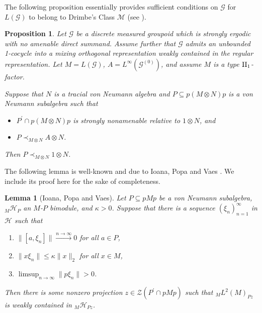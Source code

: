 \documentclass[a4paper,11pt]{article}
\numberwithin{equation}{section}
\newtheorem{lem}[thm]{Lemma}
\newtheorem{prop}[thm]{Proposition}
\theoremstyle{definition}
\theoremstyle{remark}
\numberwithin{equation}{section}
\newcommand{\rG}{\mathcal{G}}
\def\H{\mathcal H}
\def\sub{\subseteq}
\newcommand{\mc}[1]{\mathcal{#1}}
\providecommand{\norm}[1]{\lVert#1\rVert}
\numberwithin{equation}{section}
\begin{document}
The following proposition essentially provides sufficient conditions on $ \rG $ for $ L(\rG) $ to belong to Drimbe's Class $ \mc{M} $ (see \cite[Definition 3.2]{drimbe:21}). 

\begin{prop}
    Let $\rG$ be a discrete measured groupoid which is strongly ergodic with no amenable direct summand. Assume further that $ \rG $ admits an unbounded 1-cocycle into a mixing orthogonal representation weakly contained in the regular representation. Let $ M = L(\rG) $, $ A = L^{\infty}(\rG^{(0)}) $, and assume $ M $ is a type $ \rm{II}_{1} $-factor.

    Suppose that $ N $ is a tracial von Neumann algebra and $ P\sub p(M\otimes N)p $ is a von Neumann subalgebra such that
    \begin{itemize}[noitemsep, topsep=1pt]
        \item $ P^{\prime}\cap p(M\otimes N)p $ is strongly nonamenable relative to $ 1\otimes N $, and
        \item $ P\prec_{M\otimes N} A\otimes N $.
    \end{itemize}
    Then $ P\prec_{M\otimes N} 1\otimes N$.
\end{prop}


The following lemma is well-known and due to Ioana, Popa and Vaes \cite[Lemma 2.3]{ipv:10}. We include its proof here for the sake of completeness.

\begin{lem}[Ioana, Popa and Vaes]\label{lem:gapweakcont}
   Let $ P\sub pMp $ be a von Neumann subalgebra, $ _M \H_{P} $ an $ M $-$ P $ bimodule, and $ \kappa>0 $. Suppose that there is a sequence $ (\xi_{n})_{n=1}^{\infty} $ in $ \H $ such that
   \begin{enumerate}
       \item $ \norm{[a,\xi_{n}]} \xrightarrow{n\to\infty}0 $ for all $ a\in P $,
       \item $ \norm{x \xi_{n}}\leq \kappa \norm{x}_{2} $ for all $ x\in M $,
       \item $ \limsup_{n\to\infty}\norm{p \xi_{n}}>0 $.
   \end{enumerate}
   Then there is some nonzero projection $ z\in \mathcal{Z}(P^{\prime}\cap pMp) $ such that $_M L^{2}(M) _{Pz} $ is weakly contained in $ _M \H_{Pz} $.

\end{lem}
\end{document}
